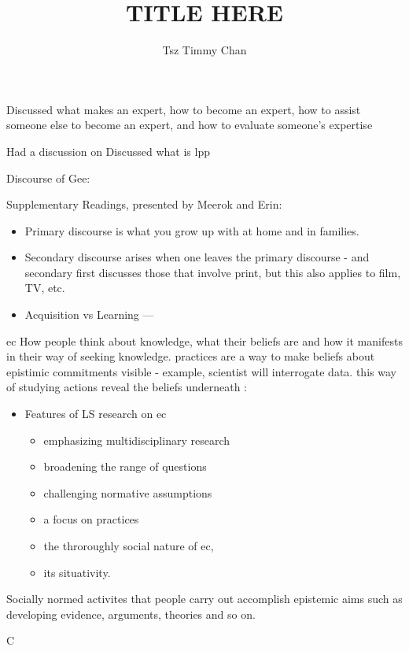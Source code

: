 \documentclass{TC}
\title{TITLE HERE}	%
\author{Tsz Timmy Chan}	%
\begin{document}
Discussed what makes an expert, how to become an expert, how to assist someone else to become an expert, and how to evaluate someone's expertise

Had a discussion on 
Discussed what is \gls{lpp}

Discourse of Gee:

Supplementary Readings, presented by Meerok and Erin:

\begin{itemize}
\item Primary discourse is what you grow up with at home and in families.
\item Secondary discourse arises when one leaves the primary discourse - and secondary first discusses those that involve print, but this also applies to film, TV, etc.
\item Acquisition vs Learning --- 
\end{itemize}  


\gls{ec} How people think about knowledge, what their beliefs are and how it manifests in their way of seeking knowledge. practices are a way to make beliefs about epistimic commitments visible - example, scientist will interrogate data. this way of studying actions reveal the beliefs underneath \parencite{fischer_epistemic_2018}:
\begin{itemize}
\item Features of LS research on \gls{ec}
	\begin{itemize}
	\item emphasizing multidisciplinary research
	\item broadening the range of questions
	\item challenging normative assumptions
	\item a focus on practices
	\item the throroughly social nature of \gls{ec},
	\item its situativity. 
	\end{itemize}
\end{itemize}
\begin{definition}
Socially normed activites that people carry out accomplish epistemic aims such as developing evidence, arguments, theories and so on.
\end{definition}

C
\end{document}
